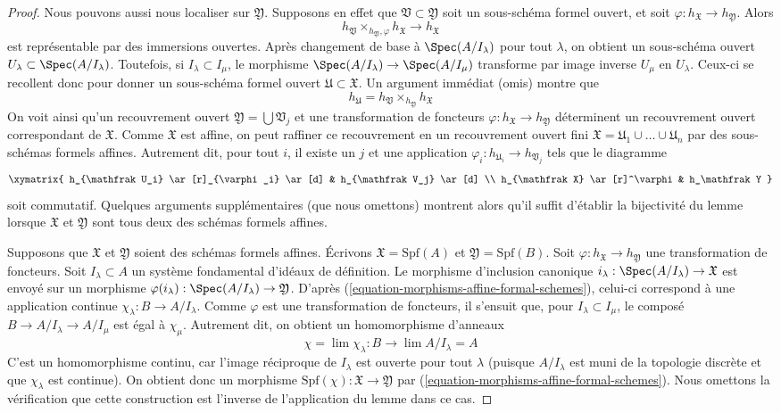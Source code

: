 \begin{proof}
\medskip\noindent
Nous pouvons aussi nous localiser sur $\mathfrak Y$.
Supposons en effet que $\mathfrak V \subset \mathfrak Y$ soit un
sous-schéma formel ouvert, et soit $\varphi : h_\mathfrak X \to h_\mathfrak Y$.
Alors
$$
h_\mathfrak V \times_{h_\mathfrak Y, \varphi} h_\mathfrak X \to h_\mathfrak X
$$
est représentable par des immersions ouvertes. Après changement de base à
$\Spec(A/I_\lambda)$ pour tout $\lambda$, on obtient un sous-schéma ouvert
$U_\lambda \subset \Spec(A/I_\lambda)$. Toutefois, si
$I_\lambda \subset I_\mu$, le morphisme $\Spec(A/I_\lambda) \to \Spec(A/I_\mu)$
transforme par image inverse $U_\mu$ en $U_\lambda$. Ceux-ci se recollent donc pour donner
un sous-schéma formel ouvert $\mathfrak U \subset \mathfrak X$.
Un argument immédiat (omis) montre que
$$
h_\mathfrak U = h_\mathfrak V \times_{h_\mathfrak Y} h_\mathfrak X
$$
On voit ainsi qu'un recouvrement ouvert
$\mathfrak Y = \bigcup \mathfrak V_j$ et une transformation
de foncteurs $\varphi :  h_\mathfrak X \to h_\mathfrak Y$
déterminent un recouvrement ouvert correspondant de $\mathfrak X$.
Comme $\mathfrak X$ est affine, on peut raffiner ce recouvrement en un
recouvrement ouvert fini
$\mathfrak X = \mathfrak U_1 \cup \ldots \cup \mathfrak U_n$
par des sous-schémas formels affines. Autrement dit, pour tout $i$, il
existe un $j$ et une application $\varphi_i : h_{\mathfrak U_i} \to h_{\mathfrak V_j}$
tels que le diagramme
$$
\xymatrix{
h_{\mathfrak U_i} \ar[r]_{\varphi_i} \ar[d] & h_{\mathfrak V_j} \ar[d] \\
h_{\mathfrak X} \ar[r]^\varphi & h_\mathfrak Y
}
$$
soit commutatif. Quelques arguments supplémentaires (que nous omettons) montrent alors
qu'il suffit d'établir la bijectivité du lemme lorsque
$\mathfrak X$ et $\mathfrak Y$ sont tous deux des schémas formels affines.

\medskip\noindent
Supposons que $\mathfrak X$ et $\mathfrak Y$ soient des schémas formels affines.
Écrivons $\mathfrak X = \text{Spf}(A)$ et $\mathfrak Y = \text{Spf}(B)$.
Soit $\varphi : h_\mathfrak X \to h_\mathfrak Y$ une transformation
de foncteurs. Soit $I_\lambda \subset A$ un système fondamental
d'idéaux de définition. Le morphisme d'inclusion canonique
$i_\lambda : \Spec(A/I_\lambda) \to \mathfrak X$ est envoyé sur un morphisme
$\varphi(i_\lambda) : \Spec(A/I_\lambda) \to \mathfrak Y$.
D'après (\ref{equation-morphisms-affine-formal-schemes}), celui-ci correspond
à une application continue $\chi_\lambda : B \to A/I_\lambda$.
Comme $\varphi$ est une transformation de foncteurs, il s'ensuit
que, pour $I_\lambda \subset I_\mu$, le composé
$B \to A/I_\lambda \to A/I_\mu$ est égal à $\chi_\mu$.
Autrement dit, on obtient un homomorphisme d'anneaux
$$
\chi = \lim \chi_\lambda : B \longrightarrow \lim A/I_\lambda = A
$$
C'est un homomorphisme continu, car l'image réciproque
de $I_\lambda$ est ouverte pour tout $\lambda$ (puisque $A/I_\lambda$ est muni de la topologie
discrète et que $\chi_\lambda$ est continue). On obtient donc
un morphisme $\text{Spf}(\chi) : \mathfrak X \to \mathfrak Y$ par
(\ref{equation-morphisms-affine-formal-schemes}).
Nous omettons la vérification que cette construction est l'inverse
de l'application du lemme dans ce cas.


\end{proof}
